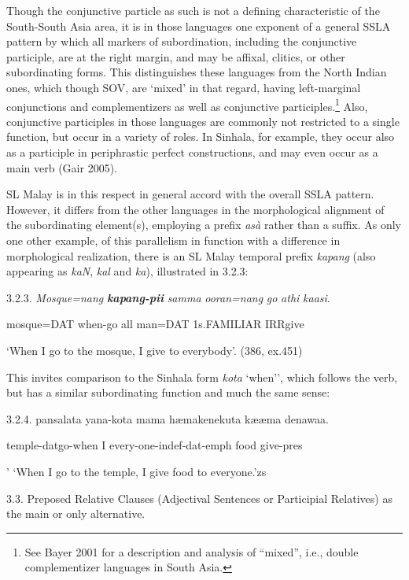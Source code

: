 \documentclass[letterpaper]{article}
\begin{document}
Though the conjunctive particle as such is not a defining characteristic of the South-South Asia area, it is in those languages one exponent of a general SSLA pattern by which all markers of subordination, including the conjunctive participle, are at the right margin, and may be affixal, clitics, or other subordinating forms. This distinguishes these languages from the North Indian ones, which though SOV, are `mixed' in that regard, having left-marginal conjunctions and complementizers as well as conjunctive participles.\footnote{See
  Bayer 2001 for a description and analysis of ``mixed'', i.e., double complementizer languages in South Asia.
} 
Also, conjunctive participles in those languages are commonly not restricted to a single function, but occur in a variety of roles. In Sinhala, for example, they occur also as a participle in periphrastic perfect constructions, and may even occur as a main verb (Gair 2005).

SL Malay is in this respect in general accord with the overall SSLA pattern. However, it differs from the other languages in the morphological alignment of the subordinating element(s), employing a prefix \textit{asà} rather than a suffix. As only one other example, of this parallelism in function with a difference in morphological realization, there is an SL Malay temporal prefix \textit{kapang} (also appearing as \textit{kaN}, \textit{kal} and \textit{ka}), illustrated in 3.2.3: 

 3.2.3. 
\ea
\gll \textit{Mosque=nang} \textbf{\textit{kapang-pii}} \textit{samma} \textit{ooran=nang} \textit{go} \textit{athi{\textdiv}} \textit{kaasi}.

   mosque=DAT  when-go   all man=DAT 1s.FAMILIAR      IRR{\textdiv}give

    `When I go to the mosque, I give to everybody'. (386, ex.451)

  This invites comparison to the Sinhala form \textit{kot}\textit{{\dag}}\textit{a} `when'', which follows the verb, but has a similar subordinating function and much the same sense:

3.2.4.  
\ea
\gll  pansalat{\dag}a  yana-kot{\dag}a  mama  h{\ae}makenekut{\dag}a  k{\ae}{\ae}ma denawaa.

  temple-datgo-when I every-one-indef-dat-emph food give-pres

'  `When I go to the temple, I give food to everyone.'zs

3.3. Preposed Relative Clauses (Adjectival Sentences or Participial Relatives) as the main or only alternative. 
\end{document}
